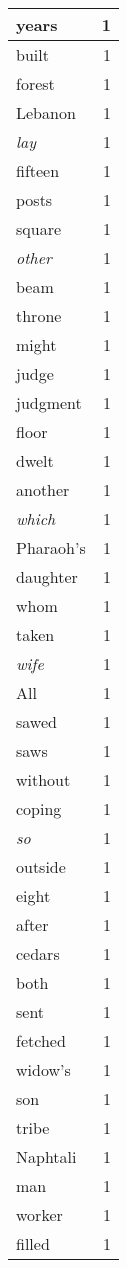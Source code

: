 \begin{center}
\begin{longtable}{l|r}
years & 1 \\ \hline
built & 1 \\ \hline
forest & 1 \\ \hline
Lebanon & 1 \\ \hline
\emph{lay} & 1 \\ \hline
fifteen & 1 \\ \hline
posts & 1 \\ \hline
square & 1 \\ \hline
\emph{other} & 1 \\ \hline
beam & 1 \\ \hline
throne & 1 \\ \hline
might & 1 \\ \hline
judge & 1 \\ \hline
judgment & 1 \\ \hline
floor & 1 \\ \hline
dwelt & 1 \\ \hline
another & 1 \\ \hline
\emph{which} & 1 \\ \hline
Pharaoh's & 1 \\ \hline
daughter & 1 \\ \hline
whom & 1 \\ \hline
taken & 1 \\ \hline
\emph{wife} & 1 \\ \hline
All & 1 \\ \hline
sawed & 1 \\ \hline
saws & 1 \\ \hline
without & 1 \\ \hline
coping & 1 \\ \hline
\emph{so} & 1 \\ \hline
outside & 1 \\ \hline
eight & 1 \\ \hline
after & 1 \\ \hline
cedars & 1 \\ \hline
both & 1 \\ \hline
sent & 1 \\ \hline
fetched & 1 \\ \hline
widow's & 1 \\ \hline
son & 1 \\ \hline
tribe & 1 \\ \hline
Naphtali & 1 \\ \hline
man & 1 \\ \hline
worker & 1 \\ \hline
filled & 1 \\ \hline

\end{longtable}
\end{center}

